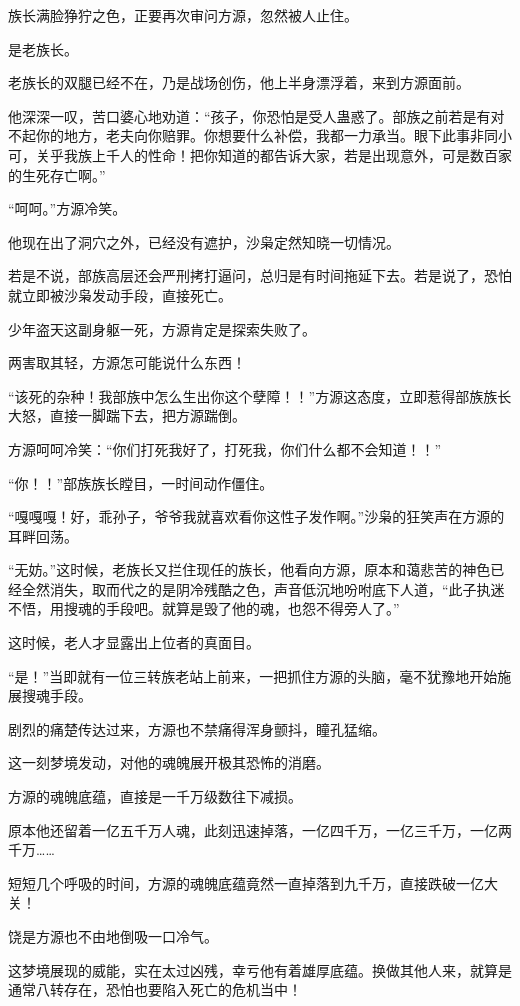 \begin{this_body}
族长满脸狰狞之色，正要再次审问方源，忽然被人止住。

是老族长。

老族长的双腿已经不在，乃是战场创伤，他上半身漂浮着，来到方源面前。

他深深一叹，苦口婆心地劝道：“孩子，你恐怕是受人蛊惑了。部族之前若是有对不起你的地方，老夫向你赔罪。你想要什么补偿，我都一力承当。眼下此事非同小可，关乎我族上千人的性命！把你知道的都告诉大家，若是出现意外，可是数百家的生死存亡啊。”

“呵呵。”方源冷笑。

他现在出了洞穴之外，已经没有遮护，沙枭定然知晓一切情况。

若是不说，部族高层还会严刑拷打逼问，总归是有时间拖延下去。若是说了，恐怕就立即被沙枭发动手段，直接死亡。

少年盗天这副身躯一死，方源肯定是探索失败了。

两害取其轻，方源怎可能说什么东西！

“该死的杂种！我部族中怎么生出你这个孽障！！”方源这态度，立即惹得部族族长大怒，直接一脚踹下去，把方源踹倒。

方源呵呵冷笑：“你们打死我好了，打死我，你们什么都不会知道！！”

“你！！”部族族长瞠目，一时间动作僵住。

“嘎嘎嘎！好，乖孙子，爷爷我就喜欢看你这性子发作啊。”沙枭的狂笑声在方源的耳畔回荡。

“无妨。”这时候，老族长又拦住现任的族长，他看向方源，原本和蔼悲苦的神色已经全然消失，取而代之的是阴冷残酷之色，声音低沉地吩咐底下人道，“此子执迷不悟，用搜魂的手段吧。就算是毁了他的魂，也怨不得旁人了。”

这时候，老人才显露出上位者的真面目。

“是！”当即就有一位三转族老站上前来，一把抓住方源的头脑，毫不犹豫地开始施展搜魂手段。

剧烈的痛楚传达过来，方源也不禁痛得浑身颤抖，瞳孔猛缩。

这一刻梦境发动，对他的魂魄展开极其恐怖的消磨。

方源的魂魄底蕴，直接是一千万级数往下减损。

原本他还留着一亿五千万人魂，此刻迅速掉落，一亿四千万，一亿三千万，一亿两千万……

短短几个呼吸的时间，方源的魂魄底蕴竟然一直掉落到九千万，直接跌破一亿大关！

饶是方源也不由地倒吸一口冷气。

这梦境展现的威能，实在太过凶残，幸亏他有着雄厚底蕴。换做其他人来，就算是通常八转存在，恐怕也要陷入死亡的危机当中！


\end{this_body}
